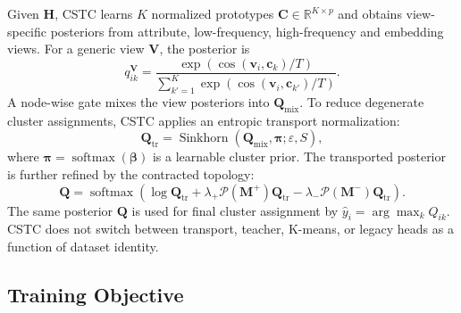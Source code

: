 Given $\mathbf{H}$, CSTC learns $K$ normalized prototypes $\mathbf{C}\in\mathbb{R}^{K\times p}$ and obtains view-specific posteriors from attribute, low-frequency, high-frequency and embedding views. For a generic view $\mathbf{V}$, the posterior is
\begin{equation}
  q_{ik}^{\mathbf{V}}
  =
  \frac{
  \exp(\cos(\mathbf{v}_i,\mathbf{c}_k)/T)
  }{
  \sum_{k'=1}^{K}\exp(\cos(\mathbf{v}_i,\mathbf{c}_{k'})/T)
  }.
\end{equation}
A node-wise gate mixes the view posteriors into $\mathbf{Q}_{\mathrm{mix}}$. To reduce degenerate cluster assignments, CSTC applies an entropic transport normalization:
\begin{equation}
  \mathbf{Q}_{\mathrm{tr}}
  =
  \operatorname{Sinkhorn}
  \left(
  \mathbf{Q}_{\mathrm{mix}},
  \boldsymbol{\pi};
  \varepsilon,S
  \right),
\end{equation}
where $\boldsymbol{\pi}=\operatorname{softmax}(\boldsymbol{\beta})$ is a learnable cluster prior. The transported posterior is further refined by the contracted topology:
\begin{equation}
  \mathbf{Q}
  =
  \operatorname{softmax}
  \left(
  \log \mathbf{Q}_{\mathrm{tr}}
  + \lambda_{+}\mathcal{P}(\mathbf{M}^{+})\mathbf{Q}_{\mathrm{tr}}
  - \lambda_{-}\mathcal{P}(\mathbf{M}^{-})\mathbf{Q}_{\mathrm{tr}}
  \right).
\end{equation}
The same posterior $\mathbf{Q}$ is used for final cluster assignment by $\hat{y}_i=\arg\max_k Q_{ik}$. CSTC does not switch between transport, teacher, K-means, or legacy heads as a function of dataset identity.

\subsection{Training Objective}
\label{subsec:objective}

